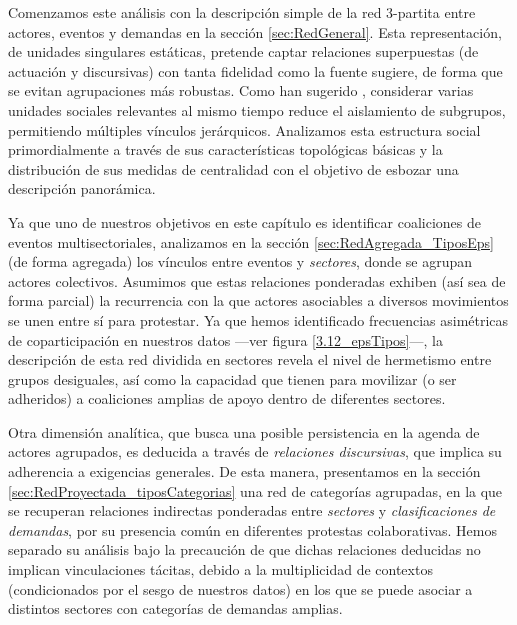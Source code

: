 \documentclass[letterpaper, 11pt]{book}
\theoremstyle{definition}
\theoremstyle{remark}
\begin{document}
Comenzamos este análisis con la descripción simple de la red 3-partita entre actores, eventos y demandas en la sección \ref{sec:RedGeneral}. 
Esta representación, de unidades singulares estáticas, pretende captar relaciones superpuestas (de actuación y discursivas) con tanta fidelidad como la fuente sugiere, de forma que se evitan agrupaciones más robustas. 
Como han sugerido \citet{2008_Nazir_TripartiteRelationships}, considerar varias unidades sociales relevantes al mismo tiempo reduce el aislamiento de subgrupos, permitiendo múltiples vínculos jerárquicos. 
Analizamos esta estructura social primordialmente a través de sus características topológicas básicas y la distribución de sus medidas de centralidad con el objetivo de esbozar una descripción panorámica. 


Ya que uno de nuestros objetivos en este capítulo es identificar coaliciones de eventos multisectoriales, analizamos en la sección \ref{sec:RedAgregada_TiposEps} (de forma agregada) los vínculos entre eventos y \emph{sectores}, donde se agrupan actores colectivos. 
Asumimos que estas relaciones ponderadas exhiben (así sea de forma parcial) la recurrencia con la que actores asociables a diversos movimientos se unen entre sí para protestar. 
Ya que hemos identificado frecuencias asimétricas de coparticipación en nuestros datos ---ver figura \ref{3.12_epsTipos}---, la descripción de esta red dividida en sectores revela el nivel de hermetismo entre grupos desiguales, así como la capacidad que tienen para movilizar (o ser adheridos) a coaliciones amplias de apoyo dentro de diferentes sectores. 


Otra dimensión analítica, que busca una posible persistencia en la agenda de actores agrupados, es deducida a través de \emph{relaciones discursivas}, que implica su adherencia a exigencias generales. 
De esta manera, presentamos en la sección \ref{sec:RedProyectada_tiposCategorias} una red de categorías agrupadas, en la que se recuperan relaciones indirectas ponderadas entre \emph{sectores} y \emph{clasificaciones de demandas}, por su presencia común en diferentes protestas colaborativas. 
Hemos separado su análisis bajo la precaución de que dichas relaciones deducidas no implican vinculaciones tácitas, debido a la multiplicidad de contextos (condicionados por el sesgo de nuestros datos) en los que se puede asociar a distintos sectores con categorías de demandas amplias. 




\end{document}
